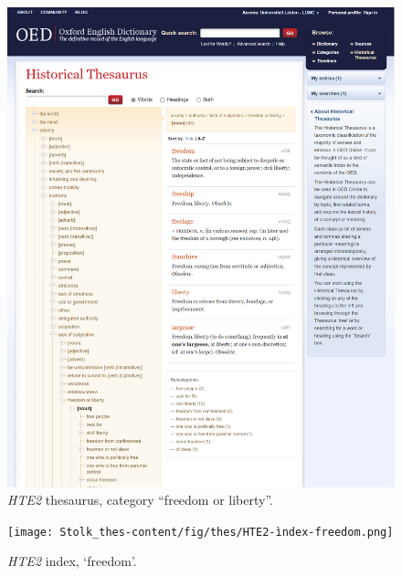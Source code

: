 \begin{figure}[htbp]
  \centering
    \includegraphics[width=\linewidth]{Stolk_thes-content/fig/thes/HTE2-thesaurus-freedomliberty.png}
  \caption{\textit{HTE2} thesaurus, category ``freedom or liberty''.}
  \label{fig:1.A:HTE2:thesaurus}
\end{figure}

\begin{figure}[htbp]
  \centering
    \texttt{[image: Stolk\_thes-content/fig/thes/HTE2-ìndex-freedom.png]}
  \caption{\textit{HTE2} index, `freedom'.}
  \label{fig:1.A:HTE2:index}
\end{figure}




